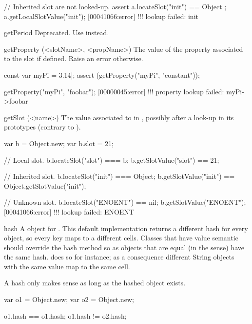 \begin{urbiscriptapi}
\begin{urbiscript}
// Inherited slot are not looked-up.
assert { a.locateSlot("init") == Object };
a.getLocalSlotValue("init");
[00041066:error] !!! lookup failed: init
\end{urbiscript}


\item[getPeriod]%
  Deprecated.  Use  instead.


\item[getProperty](<slotName>, <propName>)%
  The value of the  property associated to the slot
   if defined.  Raise an error otherwise.
\begin{urbiscript}
const var myPi = 3.14|;
assert (getProperty("myPi", "constant"));

getProperty("myPi", "foobar");
[00000045:error] !!! property lookup failed: myPi->foobar
\end{urbiscript}


\item[getSlot](<name>)%
  The value associated to  in \this, possibly after a look-up in
  its prototypes (contrary to ).
\begin{urbiassert}
var b = Object.new;
var b.slot = 21;

// Local slot.
b.locateSlot("slot") === b;
b.getSlotValue("slot") == 21;

// Inherited slot.
b.locateSlot("init") === Object;
b.getSlotValue("init") == Object.getSlotValue("init");

// Unknown slot.
b.locateSlot("ENOENT") == nil;
b.getSlotValue("ENOENT");
[00041066:error] !!! lookup failed: ENOENT
\end{urbiassert}


\item[hash]%
  A  object for \this.  This default implementation returns
  a different hash for every object, so every key maps to a different
  cells. Classes that have value semantic should override the hash method so
  as objects that are equal (in the  sense) have the
  same hash.  does so for instance; as a consequence
  different String objects with the same value map to the same cell.

  A hash only makes sense as long as the hashed object exists.

\begin{urbiassert}
var o1 = Object.new;
var o2 = Object.new;

o1.hash == o1.hash;
o1.hash != o2.hash;
\end{urbiassert}



\end{urbiscriptapi}
